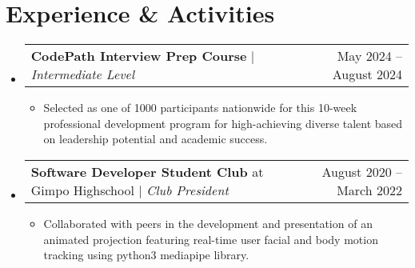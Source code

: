 \documentclass[letterpaper,11pt]{article}
\makeatletter
\newcommand{\resumeItem}[1]{
  \item\small{
    {#1 \vspace{-2pt}}
  }
}
\newcommand{\resumeProjectHeading}[2]{
    \item
    \begin{tabular*}{0.97\textwidth}{l@{\extracolsep{\fill}}r@{\hspace{-0.2in}}}
        \small#1 & #2 \\
    \end{tabular*}\vspace{-7pt}
}
\newcommand{\resumeSubHeadingListStart}{\begin{itemize}[leftmargin=0.00in, rightmargin=-0.2in, label={}]}
\newcommand{\resumeSubHeadingListEnd}{\end{itemize}}
\newcommand{\resumeItemListStart}{\begin{itemize}[leftmargin=0.15in]}
\newcommand{\resumeItemListEnd}{\end{itemize}\vspace{-5pt}}
\makeatother
\begin{document}

\section{Experience \& Activities}
    \resumeSubHeadingListStart
        \resumeProjectHeading
            {\textbf{CodePath Interview Prep Course} $|$ \emph{Intermediate Level}}{May 2024 -- August 2024}
            \resumeItemListStart
                \resumeItem{Selected as one of 1000 participants nationwide for this 10-week professional development program for high-achieving diverse talent based on leadership potential and academic success.}
            \resumeItemListEnd
        \resumeSubHeadingListEnd
    \resumeSubHeadingListStart
        \resumeProjectHeading
            {\textbf{Software Developer Student Club} at Gimpo Highschool $|$ \emph{Club President}}{August 2020 -- March 2022}
            \resumeItemListStart
                \resumeItem{Collaborated with peers in the development and presentation of an animated projection featuring real-time user facial and body motion tracking using python3 mediapipe library.}
            \resumeItemListEnd
        \resumeSubHeadingListEnd
\end{document}
